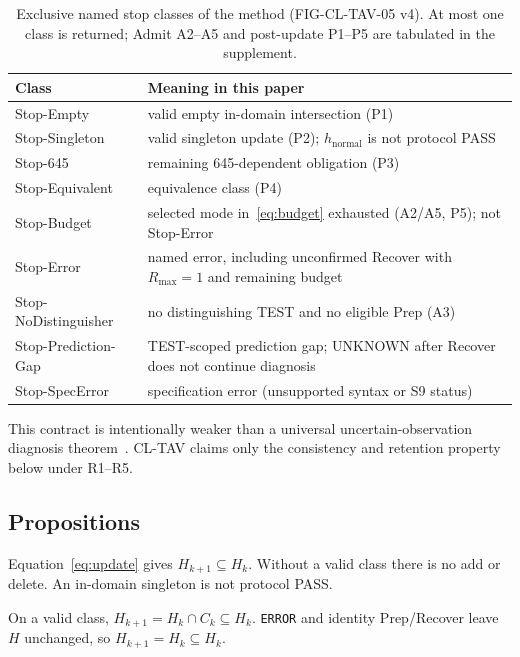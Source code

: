 \begin{table}[!t]
\caption{Exclusive named stop classes of the method (FIG-CL-TAV-05 v4). At most
one class is returned; Admit A2--A5 and post-update P1--P5 are tabulated in the
supplement.}
\label{tab:stops}
\centering
\footnotesize
\begin{tabular}{@{}p{}p{}@{}}
\hline
Class & Meaning in this paper \\
\hline
Stop-Empty & valid empty in-domain intersection (P1) \\
Stop-Singleton & valid singleton update (P2); \(h_{\mathrm{normal}}\) is not protocol PASS \\
Stop-645 & remaining 645-dependent obligation (P3) \\
Stop-Equivalent & equivalence class (P4) \\
Stop-Budget & selected mode in~\eqref{eq:budget} exhausted (A2/A5, P5); not Stop-Error \\
Stop-Error & named error, including unconfirmed Recover with \(R_{\max}=1\) and remaining budget \\
Stop-NoDistinguisher & no distinguishing TEST and no eligible Prep (A3) \\
Stop-Prediction-Gap & TEST-scoped prediction gap; UNKNOWN after Recover does not continue diagnosis \\
Stop-SpecError & specification error (unsupported syntax or S9 status) \\
\hline
\end{tabular}
\end{table}

This contract is intentionally weaker than a universal uncertain-observation
diagnosis theorem~\cite{koehl2023}. CL-TAV claims only the consistency and
retention property below under R1--R5.

\subsection{Propositions}

\begin{proposition}[Monotonicity]
\label{prop:mono}
Equation~\eqref{eq:update} gives \(H_{k+1}\subseteq H_k\). Without a valid class
there is no add or delete. An in-domain singleton is not protocol PASS.
\end{proposition}
\begin{IEEEproof}
On a valid class, \(H_{k+1}=H_k\cap C_k\subseteq H_k\). \texttt{ERROR} and
identity Prep/Recover leave \(H\) unchanged, so \(H_{k+1}=H_k\subseteq H_k\).
\end{IEEEproof}

